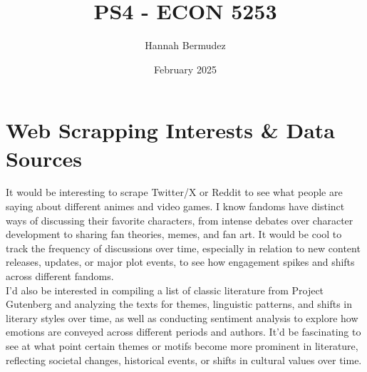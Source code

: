 \documentclass{article}
\title{PS4 - ECON 5253}
\author{Hannah Bermudez}
\date{February 2025}
\begin{document}
\maketitle

\section{Web Scrapping Interests \& Data Sources}
\hspace*{2em} It would be interesting to scrape Twitter/X or Reddit to see what people are saying about different animes and video games. I know fandoms have distinct ways of discussing their favorite characters, from intense debates over character development to sharing fan theories, memes, and fan art. It would be cool to track the frequency of discussions over time, especially in relation to new content releases, updates, or major plot events, to see how engagement spikes and shifts across different fandoms. \\

I'd also be interested in compiling a list of classic literature from Project Gutenberg and analyzing the texts for themes, linguistic patterns, and shifts in literary styles over time, as well as conducting sentiment analysis to explore how emotions are conveyed across different periods and authors. It'd be fascinating to see at what point certain themes or motifs become more prominent in literature, reflecting societal changes, historical events, or shifts in cultural values over time.
\end{document}
